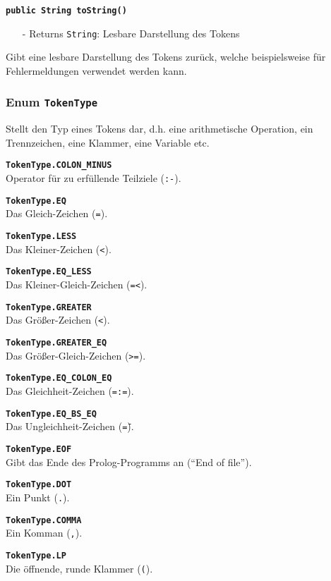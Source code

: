 \documentclass[parskip=full,11pt,twoside]{scrartcl}
\begin{document}
\textbf{\texttt{public String toString()}}
\begin{itemize}[noitemsep]
	\item[-] Returns \texttt{String}: Lesbare Darstellung des Tokens
\end{itemize}
Gibt eine lesbare Darstellung des Tokens zurück, welche beispielsweise für Fehlermeldungen verwendet werden kann.

\subsubsection{Enum \texttt{TokenType}}

Stellt den Typ eines Tokens dar, d.h. eine arithmetische Operation, ein Trennzeichen, eine Klammer, eine Variable etc.

\textbf{\texttt{TokenType.COLON\_MINUS}}\\
Operator für zu erfüllende Teilziele (\texttt{:-}).

\textbf{\texttt{TokenType.EQ}}\\
Das Gleich-Zeichen (\texttt{=}).

\textbf{\texttt{TokenType.LESS}}\\
Das Kleiner-Zeichen (\texttt{<}).

\textbf{\texttt{TokenType.EQ\_LESS}}\\
Das Kleiner-Gleich-Zeichen (\texttt{=<}).

\textbf{\texttt{TokenType.GREATER}}\\
Das Größer-Zeichen (\texttt{<}).

\textbf{\texttt{TokenType.GREATER\_EQ}}\\
Das Größer-Gleich-Zeichen (\texttt{>=}).

\textbf{\texttt{TokenType.EQ\_COLON\_EQ}}\\
Das Gleichheit-Zeichen (\texttt{=:=}).

\textbf{\texttt{TokenType.EQ\_BS\_EQ}}\\
Das Ungleichheit-Zeichen (\texttt{=\=}).

\textbf{\texttt{TokenType.EOF}}\\
Gibt das Ende des Prolog-Programms an (\enquote{End of file}).

\textbf{\texttt{TokenType.DOT}}\\
Ein Punkt (\texttt{.}).

\textbf{\texttt{TokenType.COMMA}}\\
Ein Komman (\texttt{,}).

\textbf{\texttt{TokenType.LP}}\\
Die öffnende, runde Klammer (\texttt{(}).
\end{document}
